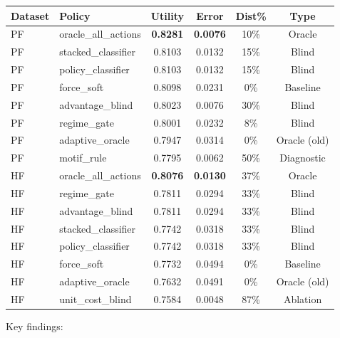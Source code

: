 \documentclass[11pt,openany]{report}
\begin{document}
\begin{center}
\begin{tabular}{llcccc}
\toprule
\textbf{Dataset} & \textbf{Policy} & \textbf{Utility} & \textbf{Error}
  & \textbf{Dist\%} & \textbf{Type} \\
\midrule
PF & oracle\_all\_actions  & \textbf{0.8281} & \textbf{0.0076} & 10\% & Oracle \\
PF & stacked\_classifier   & 0.8103 & 0.0132 & 15\% & Blind \\
PF & policy\_classifier    & 0.8103 & 0.0132 & 15\% & Blind \\
PF & force\_soft           & 0.8098 & 0.0231 &  0\% & Baseline \\
PF & advantage\_blind      & 0.8023 & 0.0076 & 30\% & Blind \\
PF & regime\_gate          & 0.8001 & 0.0232 &  8\% & Blind \\
PF & adaptive\_oracle      & 0.7947 & 0.0314 &  0\% & Oracle (old) \\
PF & motif\_rule           & 0.7795 & 0.0062 & 50\% & Diagnostic \\
\midrule
HF & oracle\_all\_actions  & \textbf{0.8076} & \textbf{0.0130} & 37\% & Oracle \\
HF & regime\_gate          & 0.7811 & 0.0294 & 33\% & Blind \\
HF & advantage\_blind      & 0.7811 & 0.0294 & 33\% & Blind \\
HF & stacked\_classifier   & 0.7742 & 0.0318 & 33\% & Blind \\
HF & policy\_classifier    & 0.7742 & 0.0318 & 33\% & Blind \\
HF & force\_soft           & 0.7732 & 0.0494 &  0\% & Baseline \\
HF & adaptive\_oracle      & 0.7632 & 0.0491 &  0\% & Oracle (old) \\
HF & unit\_cost\_blind     & 0.7584 & 0.0048 & 87\% & Ablation \\
\bottomrule
\end{tabular}
\end{center}

Key findings:
\end{document}
